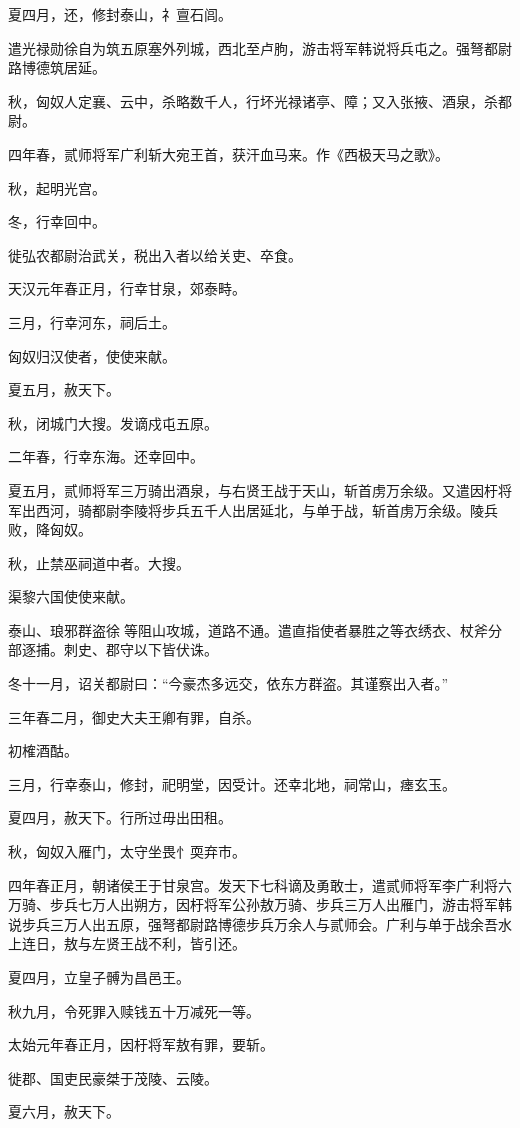 \documentclass[]{article}
\begin{document}
夏四月，还，修封泰山，礻亶石闾。

遣光禄勋徐自为筑五原塞外列城，西北至卢朐，游击将军韩说将兵屯之。强弩都尉路博德筑居延。

秋，匈奴人定襄、云中，杀略数千人，行坏光禄诸亭、障；又入张掖、酒泉，杀都尉。

四年春，贰师将军广利斩大宛王首，获汗血马来。作《西极天马之歌》。

秋，起明光宫。

冬，行幸回中。

徙弘农都尉治武关，税出入者以给关吏、卒食。

天汉元年春正月，行幸甘泉，郊泰畤。

三月，行幸河东，祠后土。

匈奴归汉使者，使使来献。

夏五月，赦天下。

秋，闭城门大搜。发谪戍屯五原。

二年春，行幸东海。还幸回中。

夏五月，贰师将军三万骑出酒泉，与右贤王战于天山，斩首虏万余级。又遣因杅将军出西河，骑都尉李陵将步兵五千人出居延北，与单于战，斩首虏万余级。陵兵败，降匈奴。

秋，止禁巫祠道中者。大搜。

渠黎六国使使来献。

泰山、琅邪群盗徐等阻山攻城，道路不通。遣直指使者暴胜之等衣绣衣、杖斧分部逐捕。刺史、郡守以下皆伏诛。

冬十一月，诏关都尉曰：``今豪杰多远交，依东方群盗。其谨察出入者。''

三年春二月，御史大夫王卿有罪，自杀。

初榷酒酤。

三月，行幸泰山，修封，祀明堂，因受计。还幸北地，祠常山，瘗玄玉。

夏四月，赦天下。行所过毋出田租。

秋，匈奴入雁门，太守坐畏忄耎弃市。

四年春正月，朝诸侯王于甘泉宫。发天下七科谪及勇敢士，遣贰师将军李广利将六万骑、步兵七万人出朔方，因杅将军公孙敖万骑、步兵三万人出雁门，游击将军韩说步兵三万人出五原，强弩都尉路博德步兵万余人与贰师会。广利与单于战余吾水上连日，敖与左贤王战不利，皆引还。

夏四月，立皇子髆为昌邑王。

秋九月，令死罪入赎钱五十万减死一等。

太始元年春正月，因杅将军敖有罪，要斩。

徙郡、国吏民豪桀于茂陵、云陵。

夏六月，赦天下。
\end{document}
